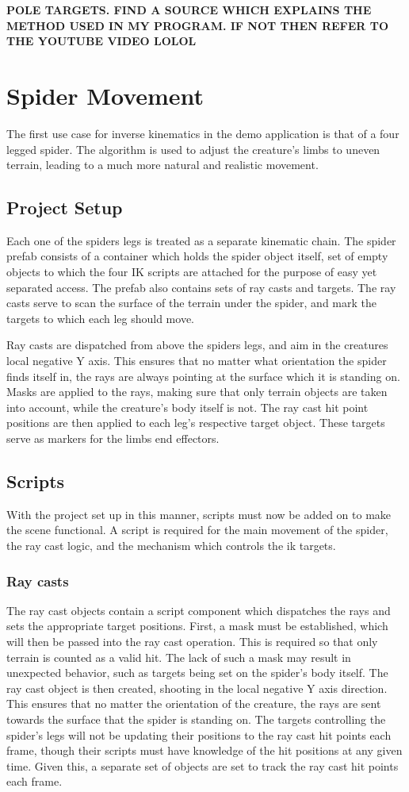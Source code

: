 \textbf{POLE TARGETS. FIND A SOURCE WHICH EXPLAINS THE METHOD USED IN MY
PROGRAM. IF NOT THEN REFER TO THE YOUTUBE VIDEO LOLOL}


\section{Spider Movement}
The first use case for inverse kinematics in the demo application is that of
a four legged spider. The algorithm is used to adjust the creature's limbs to
uneven terrain, leading to a much more natural and realistic movement.
\subsection{Project Setup}
Each one of the spiders legs is treated as a separate kinematic chain. The
spider prefab consists of a container which holds the spider object itself, set
of empty objects to which the four IK scripts are attached for the purpose of
easy yet separated access. The prefab also contains sets of ray casts and
targets. The ray casts serve to scan the surface of the terrain under the
spider, and mark the targets to which each leg should move.

Ray casts are dispatched from above the spiders legs, and aim in the creatures
local negative Y axis. This ensures that no matter what orientation the spider
finds itself in, the rays are always pointing at the surface which it is
standing on. Masks are applied to the rays, making sure that only terrain
objects are taken into account, while the creature's body itself is not. The ray
cast hit point positions are then applied to each leg's respective target
object. These targets serve as markers for the limbs end effectors. 

\subsection{Scripts}
With the project set up in this manner, scripts must now be added on to make the
scene functional. A script is required for the main movement of the spider, the
ray cast logic, and the mechanism which controls the ik targets.

\subsubsection{Ray casts}
The ray cast objects contain a script component which dispatches the rays and
sets the appropriate target positions. First, a mask must be established, which
will then be passed into the ray cast operation. This is required so that only
terrain is counted as a valid hit. The lack of such a mask may result in
unexpected behavior, such as targets being set on the spider's body itself. The
ray cast object is then created, shooting in the local negative Y axis
direction. This ensures that no matter the orientation of the creature, the rays
are sent towards the surface that the spider is standing on. The targets
controlling the spider's legs will not be updating their positions to the
ray cast hit points each frame, though their scripts must have knowledge of the
hit positions at any given time. Given this, a separate set of objects are set
to track the ray cast hit points each frame.

